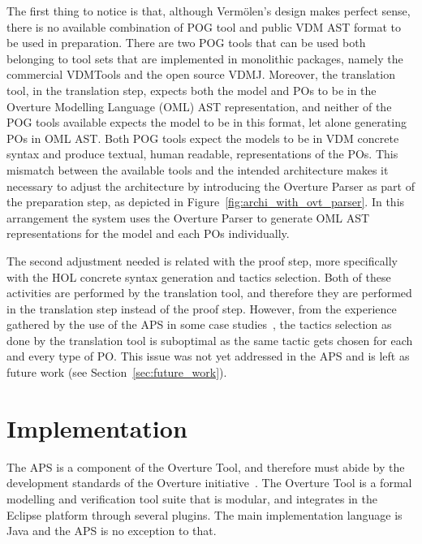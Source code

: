 \documentclass[]{article}
\begin{document}
The first thing to notice is that, although Verm\"olen's design makes perfect sense, there is no available combination of POG tool and public VDM AST format to be used in preparation.
There are two POG tools that can be used both belonging to tool sets that are implemented in monolithic packages, namely the commercial VDMTools and the open source VDMJ.
Moreover, the translation tool, in the translation step, expects both the model and POs to be in the Overture Modelling Language (OML) AST representation, and neither of the POG tools available expects the model to be in this format, let alone generating POs in OML AST.
Both POG tools expect the models to be in VDM concrete syntax and produce textual, human readable, representations of the POs.
This mismatch between the available tools and the intended architecture makes it necessary to adjust the architecture by introducing the Overture Parser as part of the preparation step, as depicted in Figure~\ref{fig:archi_with_ovt_parser}.
In this arrangement the system uses the Overture Parser to generate OML AST representations for the model and each POs individually.

The second adjustment needed is related with the proof step, more specifically with the HOL concrete syntax generation and tactics selection.
Both of these activities are performed by the translation tool, and therefore they are performed in the translation step instead of the proof step.
However, from the experience gathered by the use of the APS in some case studies~\cite{MiguelMSc,SBMF09paper}, the tactics selection as done by the translation tool is suboptimal as the same tactic gets chosen for each and every type of PO.
This issue was not yet addressed in the APS and is left as future work (see Section~\ref{sec:future_work}).

\section{Implementation}
\label{sec:implementation}

The APS is a component of the Overture Tool, and therefore must abide by the development standards of the Overture initiative~\cite{OverturePaper}.
The Overture Tool is a formal modelling and verification tool suite that is modular, and integrates in the Eclipse platform through several plugins.
The main implementation language is Java and the APS is no exception to that.
\end{document}
